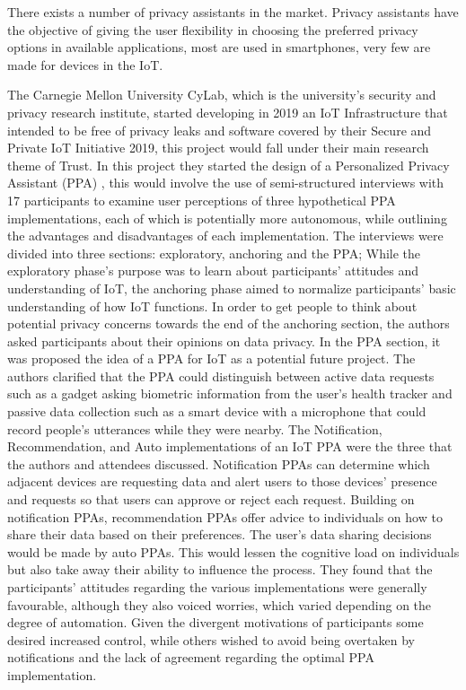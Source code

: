 There exists a number of privacy assistants in the market. Privacy assistants
have the objective of giving the user flexibility in choosing the preferred
privacy options in available applications, most are used in smartphones,
very few are made for devices in the IoT.

The Carnegie Mellon University CyLab, which is the university's security
and privacy research institute, started developing in 2019 an IoT Infrastructure
that intended to be free of privacy leaks and software covered by their
Secure and Private IoT Initiative 2019, this project would fall under
their main research theme of Trust. In this project they started the design
of a Personalized Privacy Assistant (PPA) \cite{ColnagoInforming}, this
would involve the use of semi-structured interviews with 17 participants
to examine user perceptions of three hypothetical PPA implementations,
each of which is potentially more autonomous, while outlining the advantages
and disadvantages of each implementation. The interviews were divided into
three sections: exploratory, anchoring and the PPA; While the exploratory
phase's purpose was to learn about participants' attitudes and understanding
of IoT, the anchoring phase aimed to normalize participants' basic understanding
of how IoT functions. In order to get people to think about potential privacy
concerns towards the end of the anchoring section, the authors asked participants
about their opinions on data privacy. In the PPA section, it was proposed
the idea of a PPA for IoT as a potential future project. The authors clarified
that the PPA could distinguish between active data requests such as a gadget
asking biometric information from the user's health tracker and passive
data collection such as a smart device with a microphone that could record
people's utterances while they were nearby. The Notification, Recommendation,
and Auto implementations of an IoT PPA were the three that the authors and
attendees discussed. Notification PPAs can determine which adjacent devices
are requesting data and alert users to those devices' presence and requests
so that users can approve or reject each request. Building on notification
PPAs, recommendation PPAs offer advice to individuals on how to share their data
based on their preferences. The user's data sharing decisions would be made
by auto PPAs. This would lessen the cognitive load on individuals but also
take away their ability to influence the process. They found that the participants'
attitudes regarding the various implementations were generally favourable,
although they also voiced worries, which varied depending on the degree
of automation. Given the divergent motivations of participants some desired
increased control, while others wished to avoid being overtaken by notifications
and the lack of agreement regarding the optimal PPA implementation.

